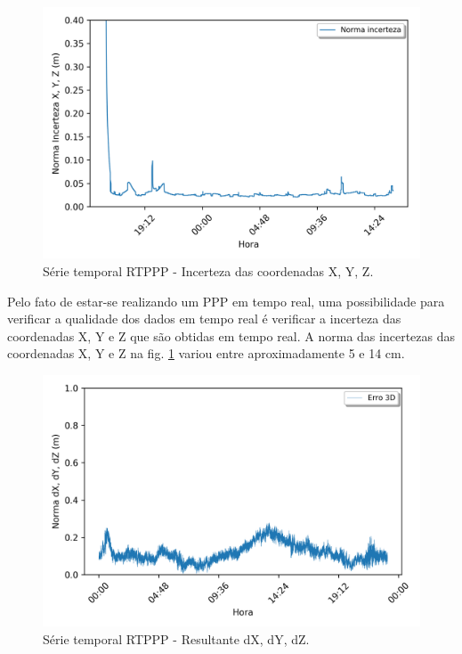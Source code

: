 \begin{figure}[H]
\centering
\includegraphics[scale=0.9]{data/Graphics/POAL001_ppp_wizard/POAL001_ppp_wizard_graphic_uncertainty.png}
\caption{Série temporal RTPPP - Incerteza das coordenadas X, Y, Z.}
\label{incert1}
\end{figure}

Pelo fato de estar-se realizando um PPP em tempo real, uma possibilidade para verificar a qualidade dos dados em tempo real é verificar a incerteza das coordenadas X, Y e Z que são obtidas em tempo real. A norma das incertezas das coordenadas X, Y e Z na fig. \ref{incert1} variou entre aproximadamente 5 e 14 cm.

\begin{figure}[H]
\centering
\includegraphics[scale=0.9]{data/Graphics/POAL20636/POAL20636_graphic_result.png}
\caption{Série temporal RTPPP - Resultante dX, dY, dZ.}
\label{result1}
\end{figure}

